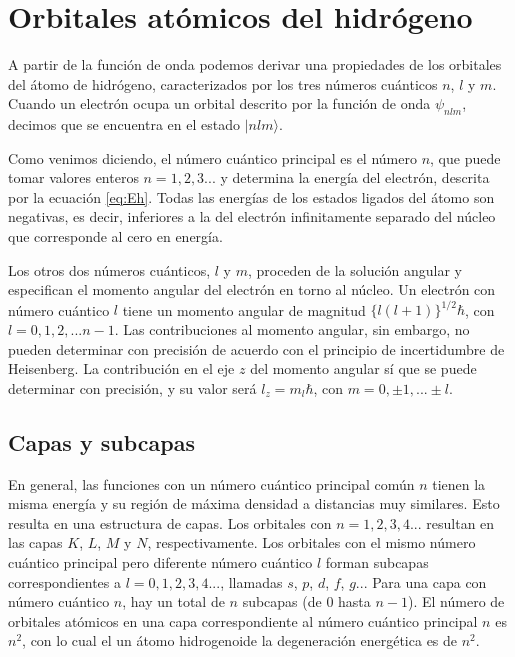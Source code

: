 \section{Orbitales atómicos del hidrógeno}
A partir de la función de onda podemos derivar una 
propiedades de los orbitales del átomo de hidrógeno, 
caracterizados por los tres números cuánticos $n$, $l$ y
$m$. Cuando un electrón ocupa un orbital descrito por la
función de onda $\psi_{nlm}$, decimos que se
encuentra en el estado $|nlm\rangle$.

Como venimos diciendo, el número cuántico principal
es el número $n$, que puede tomar valores enteros $n=1,2,3...$
y determina la energía del electrón, descrita por la ecuación \ref{eq:Eh}.
Todas las energías de los estados ligados del átomo son negativas,
es decir, inferiores a la del electrón infinitamente separado
del núcleo que corresponde al cero en energía.

Los otros dos números cuánticos, $l$ y $m$, proceden de la solución
angular y especifican el momento angular del electrón en torno al 
núcleo. Un electrón con número cuántico $l$ tiene un momento angular
de magnitud $\{l(l+1)\}^{1/2}\hbar$, con $l=0,1,2,...n-1$. 
Las contribuciones al momento angular, sin embargo, no pueden
determinar con precisión de acuerdo con el principio de
incertidumbre de Heisenberg. La contribución en el eje $z$ del 
momento angular sí que se puede determinar con precisión, y su valor 
será $l_z=m_l\hbar$, con $m=0,\pm 1,...\pm l$.

\subsection{Capas y subcapas}
En general, las funciones con un número cuántico principal común $n$
tienen la misma energía y su región de máxima densidad a distancias
muy similares. Esto resulta en una estructura de capas. Los orbitales
con $n=1,2,3,4...$ resultan en las capas $K$, $L$, $M$ y $N$, respectivamente.
Los orbitales con el mismo número cuántico principal pero diferente 
número cuántico $l$ forman subcapas correspondientes a $l=0,1,2,3,4...$,
llamadas $s$, $p$, $d$, $f$, $g$... Para una capa con número cuántico 
$n$, hay un total de $n$ subcapas (de 0 hasta $n-1$). El número de 
orbitales atómicos en una capa correspondiente al número cuántico 
principal $n$ es $n^2$, con lo cual el un átomo hidrogenoide
la degeneración energética es de $n^2$.

